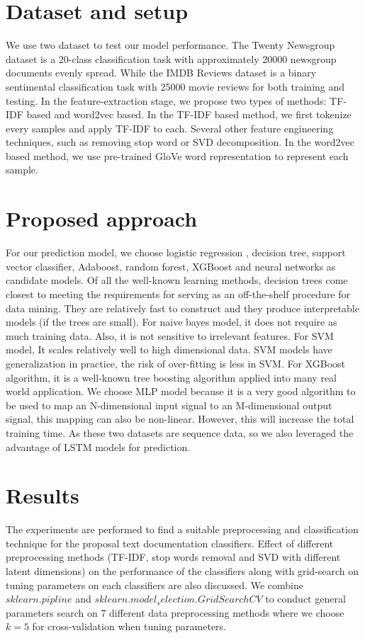 \documentclass[11pt]{scrartcl}
\begin{document}
\section{Dataset and setup}
We use two dataset to test our model performance. The Twenty Newsgroup dataset is a 20-class classification task with approximately 20000 newsgroup documents evenly spread\cite{Lang95}. While the IMDB Reviews dataset is a binary sentimental classification task with 25000 movie reviews for both training and testing\cite{maas-EtAl:2011:ACL-HLT2011}. In the feature-extraction stage, we propose two types of methods: TF-IDF based and word2vec based. In the TF-IDF based method, we first tokenize every samples and apply TF-IDF to each. Several other feature engineering techniques, such as removing stop word or SVD decomposition. In the word2vec based method, we use pre-trained GloVe\cite{pennington2014glove} word representation to represent each sample.

\section{Proposed approach}
For our prediction model, we choose logistic regression , decision tree, support vector classifier, Adaboost, random forest, XGBoost and neural networks as candidate models. Of all the well-known learning methods, decision trees come closest to meeting the requirements for serving as an off-the-shelf procedure for data mining. They are relatively fast to construct and they produce interpretable models (if the trees are small). For naive bayes model, it does not require as much training data. Also, it is not sensitive to irrelevant features. For SVM model, It scales relatively well to high dimensional data. SVM models have generalization in practice, the risk of over-fitting is less in SVM. For XGBoost algorithm, it is a well-known tree boosting algorithm applied into many real world application. We choose MLP model because it is a very good algorithm to be used to map an N-dimensional input signal to an M-dimensional output signal, this mapping can also be non-linear. However, this will increase the total training time.  As these two datasets are sequence data, so we also leveraged the advantage of LSTM models for prediction.

\section{Results}

The experiments are performed to find a suitable preprocessing and classification technique for the proposal text documentation classifiers. Effect of different preprocessing methods (TF-IDF, stop words removal and SVD with different latent dimensions) on the performance of the classifiers along with grid-search on tuning parameters on each classifiers are also discussed. We combine $sklearn.pipline$ and $sklearn.model_selection.GridSearchCV$ to conduct general parameters search on 7 different data preprocessing methods where we choose $k=5$ for cross-validation when tuning parameters. 
\end{document}
